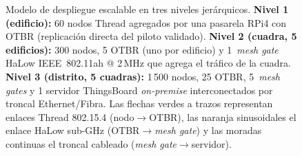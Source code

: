 \begin{figure}[H]
\centering
\resizebox{0.95\textwidth}{!}{%
%
}%
\caption[Topología jerárquica multi-gateway: edificio $\rightarrow$ cuadra $\rightarrow$ distrito]%
{Modelo de despliegue escalable en tres niveles jerárquicos. \textbf{Nivel 1 (edificio):} 60 nodos Thread agregados por una pasarela RPi4 con OTBR (replicación directa del piloto validado). \textbf{Nivel 2 (cuadra, 5 edificios):} 300 nodos, 5 OTBR (uno por edificio) y 1~\emph{mesh gate} HaLow IEEE~802.11ah @ 2\,MHz que agrega el tráfico de la cuadra. \textbf{Nivel 3 (distrito, 5 cuadras):} 1\,500 nodos, 25 OTBR, 5~\emph{mesh gates} y 1 servidor ThingsBoard \emph{on-premise} interconectados por troncal Ethernet/Fibra. Las flechas verdes a trazos representan enlaces Thread 802.15.4 (nodo$\rightarrow$OTBR), las naranja sinusoidales el enlace HaLow sub-GHz (OTBR$\rightarrow$\emph{mesh gate}) y las moradas continuas el troncal cableado (\emph{mesh gate}$\rightarrow$servidor).}
\label{fig:topologia-multi-gateway}
\end{figure}
